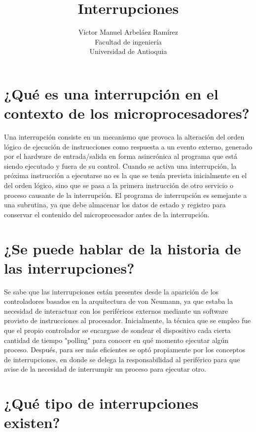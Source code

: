 \documentclass[12pt, letter]{article}
\title{\huge{Interrupciones}}
\author{Victor Manuel Arbeláez Ramírez \\ Facultad de ingeniería \\ Universidad de Antioquia}
\date{}
\begin{document}
\raggedright

\maketitle

\section*{¿Qué es una interrupción en el contexto de los microprocesadores?}

\setlength{\parindent}{31pt}
Una interrupción consiste en un mecanismo que provoca la alteración del orden lógico de ejecución de instrucciones como respuesta a un evento externo, generado por el hardware de entrada/salida en forma asincrónica al programa que está siendo ejecutado y fuera de su control. 
\setlength{\parindent}{31pt}
Cuando se activa una interrupción, la próxima instrucción a ejecutarse no es la que se tenía prevista inicialmente en el del orden lógico, sino que se pasa a la primera instrucción de otro servicio o proceso causante de la interrupción. El programa de interrupción es semejante a una subrutina, ya que debe almacenar los datos de estado y registro para conservar el contenido del microprocesador antes de la interrupción.


\section*{¿Se puede hablar de la historia de las interrupciones?}

\setlength{\parindent}{31pt}
Se sabe que las interrupciones están presentes desde la aparición de los controladores basados en la arquitectura de von Neumann, ya que estaba la necesidad de interactuar con los periféricos externos mediante un software provisto de instrucciones al procesador. Inicialmente, la técnica que se empleo fue que el propio controlador se encargase de sondear el dispositivo cada cierta cantidad de tiempo "polling" para conocer en qué momento ejecutar algún proceso. Después, para ser más eficientes se optó propiamente por los conceptos de interrupciones, en donde se delega la responsabilidad al periférico para que avise de la necesidad de interrumpir un proceso para ejecutar otro.

\section*{¿Qué tipo de interrupciones existen?}
\end{document}
